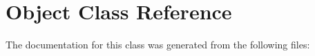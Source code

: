\hypertarget{class_object}{}\section{Object Class Reference}
\label{class_object}


The documentation for this class was generated from the following files\+: